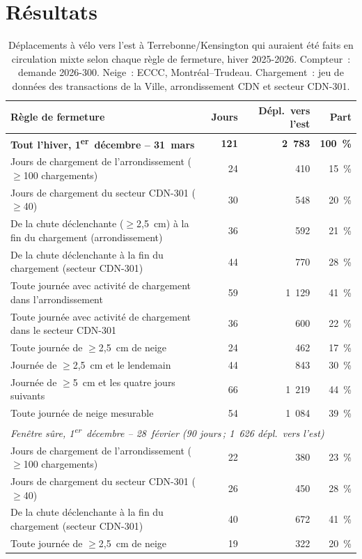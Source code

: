 \documentclass[11pt,letterpaper]{article}
\begin{document}
\section{Résultats}

\begin{table}[htbp]
\centering\footnotesize
\begin{tabular}{p{8.6cm}rrr}
\toprule
Règle de fermeture & Jours & Dépl.\ vers l'est & Part \\
\midrule
\textbf{Tout l'hiver, 1\textsuperscript{er}~décembre -- 31~mars} & \textbf{121} & \textbf{2~783} & \textbf{100~\%} \\[2pt]
Jours de chargement de l'arrondissement ($\geq$100 chargements) & 24 & 410 & 15~\% \\
Jours de chargement du secteur CDN-301 ($\geq$40) & 30 & 548 & 20~\% \\
De la chute déclenchante ($\geq$2,5~cm) à la fin du chargement (arrondissement) & 36 & 592 & 21~\% \\
De la chute déclenchante à la fin du chargement (secteur CDN-301) & 44 & 770 & 28~\% \\
Toute journée avec activité de chargement dans l'arrondissement & 59 & 1~129 & 41~\% \\
Toute journée avec activité de chargement dans le secteur CDN-301 & 36 & 600 & 22~\% \\
Toute journée de $\geq$2,5~cm de neige & 24 & 462 & 17~\% \\
Journée de $\geq$2,5~cm et le lendemain & 44 & 843 & 30~\% \\
Journée de $\geq$5~cm et les quatre jours suivants & 66 & 1~219 & 44~\% \\
Toute journée de neige mesurable & 54 & 1~084 & 39~\% \\
\midrule
\multicolumn{4}{l}{\emph{Fenêtre sûre, 1\textsuperscript{er}~décembre -- 28~février (90 jours\,; 1~626 dépl.\ vers l'est)}} \\
Jours de chargement de l'arrondissement ($\geq$100 chargements) & 22 & 380 & 23~\% \\
Jours de chargement du secteur CDN-301 ($\geq$40) & 26 & 450 & 28~\% \\
De la chute déclenchante à la fin du chargement (secteur CDN-301) & 40 & 672 & 41~\% \\
Toute journée de $\geq$2,5~cm de neige & 19 & 322 & 20~\% \\
\bottomrule
\end{tabular}
\caption{Déplacements à vélo vers l'est à Terrebonne/Kensington qui
auraient été faits en circulation mixte selon chaque règle de fermeture,
hiver 2025-2026. Compteur~: demande 2026-300. Neige~: ECCC,
Montréal--Trudeau. Chargement~: jeu de données des transactions de la
Ville, arrondissement CDN et secteur CDN-301.}\label{tab:season}
\end{table}
\end{document}
